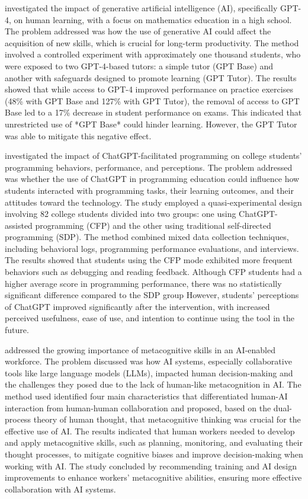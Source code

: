 \documentclass[a4paper,twoside]{article}
\begin{document}
\cite{Bastani24} investigated the impact of generative artificial intelligence
(AI), specifically GPT-4, on human learning, with a focus on mathematics
education in a high school. The problem addressed was how the use of generative
AI could affect the acquisition of new skills, which is crucial for long-term
productivity. The method involved a controlled experiment with approximately
one thousand students, who were exposed to two GPT-4-based tutors: a simple
tutor (GPT Base) and another with safeguards designed to promote learning
(GPT Tutor). The results showed that while access to GPT-4 improved performance
on practice exercises (48\% with GPT Base and 127\% with GPT Tutor), the removal
of access to GPT Base led to a 17\% decrease in student performance on exams.
This indicated that unrestricted use of *GPT Base* could hinder learning.
However, the GPT Tutor was able to mitigate this negative effect.

\cite{Boudouaia24} investigated the impact of ChatGPT-facilitated programming on
college students’ programming behaviors, performance, and perceptions. The
problem addressed was whether the use of ChatGPT in programming education could
influence how students interacted with programming tasks, their learning
outcomes, and their attitudes toward the technology. The study employed a
quasi-experimental design involving 82 college students divided into two
groups: one using ChatGPT-assisted programming (CFP) and the other using
traditional self-directed programming (SDP). The method combined mixed data
collection techniques, including behavioral logs, programming performance
evaluations, and interviews. The results showed that students using the CFP mode
exhibited more frequent behaviors such as debugging and reading feedback.
Although CFP students had a higher average score in programming performance,
there was no statistically significant difference compared to the SDP group
However, students’ perceptions of ChatGPT improved significantly after the
intervention, with increased perceived usefulness, ease of use, and intention to
continue using the tool in the future.

\cite{Sidra24} addressed the growing importance of metacognitive skills in an
AI-enabled workforce. The problem discussed was how AI systems, especially
collaborative tools like large language models (LLMs), impacted human
decision-making and the challenges they posed due to the lack of human-like
metacognition in AI. The method used identified four main characteristics that
differentiated human-AI interaction from human-human collaboration and proposed,
based on the dual-process theory of human thought, that metacognitive thinking
was crucial for the effective use of AI. The results indicated that human
workers needed to develop and apply metacognitive skills, such as planning,
monitoring, and evaluating their thought processes, to mitigate cognitive biases
and improve decision-making when working with AI. The study concluded by
recommending training and AI design improvements to enhance workers’
metacognitive abilities, ensuring more effective collaboration with AI systems.
\end{document}

